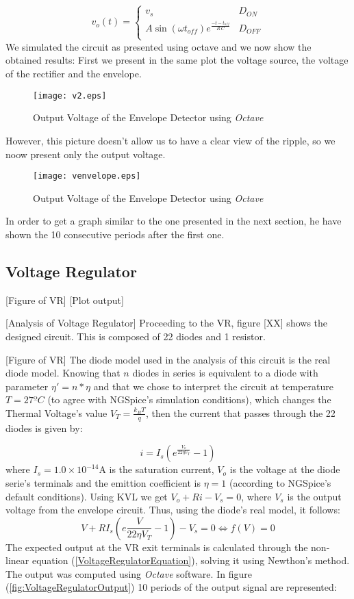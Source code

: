 \begin{equation}
	v_o(t) = \left\{
\begin{array}{ll}
	v_s & D_{ON} \\
	A  \sin(\omega t_{off})  e^{\frac{-t-t_{off}}{R\,C}} & D_{OFF}\\
\end{array}
\right.
\end{equation}
We simulated the circuit as presented using octave and we now show the obtained results:
First we present in the same plot the voltage source, the voltage of the rectifier and the envelope.
\begin{figure}[H]
  \centering
  \texttt{[image: v2.eps]}
  \caption{Output Voltage of the Envelope Detector using \emph{Octave}}
  \label{fig:venvelope}
\end{figure}
However, this picture doesn't allow us to have a clear view of the ripple, so we noow present only the output voltage.
\begin{figure}[H]
  \centering
  \texttt{[image: venvelope.eps]}
  \caption{Output Voltage of the Envelope Detector using \emph{Octave}}
  \label{fig:venvelope}
\end{figure}
In order to get a graph similar to the one presented in the next section, he have shown the 10 consecutive periods after the first one.

\subsection{Voltage Regulator}
[Figure of VR]
[Plot output]

[Analysis of Voltage Regulator]
Proceeding to the VR, figure [XX] shows the designed circuit. This is composed of 22 diodes and 1 resistor.

[Figure of VR]
The diode model used in the analysis of this circuit is the real diode model. Knowing that $n$ diodes in series is equivalent to a diode with parameter $\eta'=n*\eta$ and that we chose to
interpret the circuit at temperature $T=27ºC$ (to agree with NGSpice's simulation conditions), which changes the Thermal Voltage's value $V_T=\frac{k_BT}{q}$, then the current that passes through the 22 diodes is given by:

\begin{equation}
i=I_s(e^{\frac{V_o}{22 \eta V_T}}-1)
\end{equation}
where $I_s=1.0\times 10^{-14}$A is the saturation current, $V_o$ is the voltage at the diode serie's terminals and the emittion coefficient is $\eta=1$ (according to NGSpice's default conditions).
Using KVL we get $V_o+Ri-V_s=0$, where $V_s$ is the output voltage from the envelope circuit. Thus, using the diode's real model, it follows:
\begin{equation}
  V+RI_s(e{\frac{V}{22 \eta V_T}}-1)-V_s=0 \Leftrightarrow f(V)=0
  \label{VoltageRegulatorEquation}
\end{equation}
The expected output at the VR exit terminals is calculated through the non-linear equation (\ref{VoltageRegulatorEquation}), solving it using Newthon's method.
The output was computed using \textit{Octave} software. In figure (\ref{fig:VoltageRegulatorOutput}) 10 periods of the output signal are represented:

